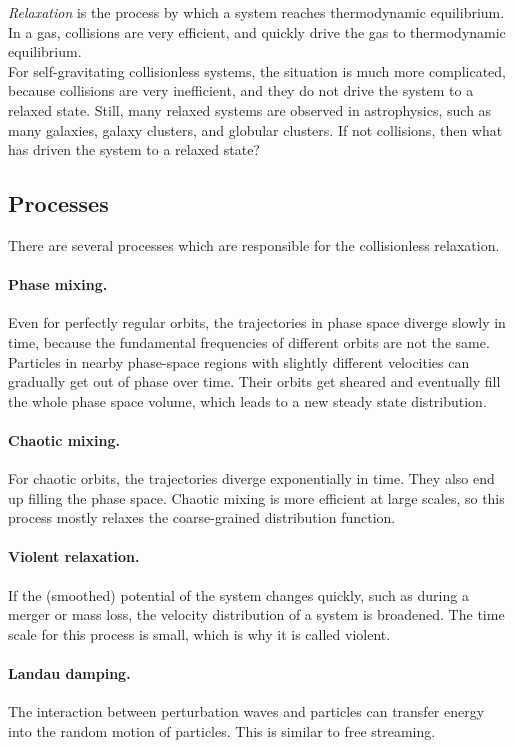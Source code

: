 \emph{Relaxation} is the process by which a system reaches thermodynamic equilibrium. In a gas, collisions are very efficient, and quickly drive the gas to thermodynamic equilibrium.\\
For self-gravitating collisionless systems, the situation is much more complicated, because collisions are very inefficient, and they do not drive the system to a relaxed state.
Still, many relaxed systems are observed in astrophysics, such as many galaxies, galaxy clusters, and globular clusters.
If not collisions, then what has driven the system to a relaxed state?

\subsection{Processes}

There are several processes which are responsible for the collisionless relaxation.

\paragraph{Phase mixing.}
Even for perfectly regular orbits, the trajectories in phase space diverge slowly in time, because the fundamental frequencies of different orbits are not the same.
Particles in nearby phase-space regions with slightly different velocities can gradually get out of phase over time.
Their orbits get sheared and eventually fill the whole phase space volume, which leads to a new steady state distribution.

\paragraph{Chaotic mixing.}
For chaotic orbits, the trajectories diverge exponentially in time. They also end up filling the phase space.
Chaotic mixing is more efficient at large scales, so this process mostly relaxes the coarse-grained distribution function.

\paragraph{Violent relaxation.}
If the (smoothed) potential of the system changes quickly, such as during a merger or mass loss, the velocity distribution of a system is broadened.
The time scale for this process is small, which is why it is called violent.

\paragraph{Landau damping.}
The interaction between perturbation waves and particles can transfer energy into the random motion of particles. This is similar to free streaming.



